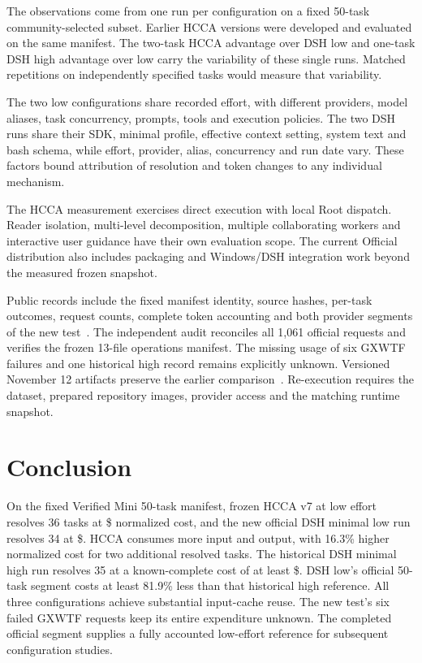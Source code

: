 \documentclass[10pt,a4paper]{article}
\begin{document}
The observations come from one run per configuration on a fixed 50-task
community-selected subset. Earlier HCCA versions were developed and evaluated
on the same manifest. The two-task HCCA advantage over DSH low and one-task
DSH high advantage over low carry the variability of these single runs.
Matched repetitions on independently specified tasks would measure that
variability.

The two low configurations share recorded effort, with different providers,
model aliases, task concurrency, prompts, tools and execution policies. The
two DSH runs share their SDK, minimal profile, effective context setting,
system text and bash schema, while effort, provider, alias, concurrency and
run date vary. These factors bound attribution of resolution and token changes
to any individual mechanism.

The HCCA measurement exercises direct execution with local Root dispatch.
Reader isolation, multi-level decomposition, multiple collaborating workers
and interactive user guidance have their own evaluation scope. The current
Official distribution also includes packaging and Windows/DSH integration
work beyond the measured frozen snapshot.

Public records include the fixed manifest identity, source hashes, per-task
outcomes, request counts, complete token accounting and both provider
segments of the new test~\cite{artifacts}. The independent audit reconciles all
1,061 official requests and verifies the frozen 13-file operations manifest.
The missing usage of six GXWTF failures and one historical high record remains
explicitly unknown. Versioned November 12 artifacts preserve the earlier
comparison~\cite{historical}. Re-execution requires the dataset, prepared
repository images, provider access and the matching runtime snapshot.

\newpage
\section{Conclusion}

On the fixed Verified Mini 50-task manifest, frozen HCCA v7 at low effort
resolves 36 tasks at \$\HCost{} normalized cost, and the new official DSH
minimal low run resolves 34 at \$\LCost{}. HCCA consumes more input and
output, with 16.3\% higher normalized cost for two additional resolved tasks.
The historical DSH minimal high run resolves 35 at a known-complete cost of
at least \$\BCost{}. DSH low's official 50-task segment costs at least 81.9\%
less than that historical high reference. All three configurations achieve
substantial input-cache reuse. The new test's six failed GXWTF requests keep
its entire expenditure unknown. The completed official segment supplies a
fully accounted low-effort reference for subsequent configuration studies.
\end{document}
